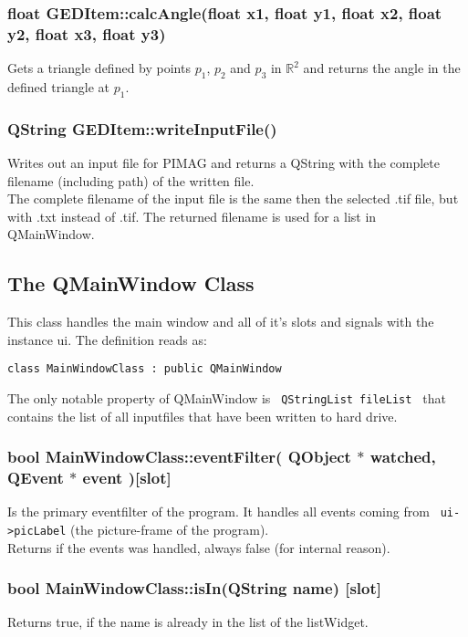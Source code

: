 \subsubsection{float GEDItem::calcAngle(float x1, float y1, float x2, float y2, float x3, float y3)}
Gets a triangle defined by points $p_1$, $p_2$ and $p_3$ in $\mathbb{R}^2$ and returns the angle in the defined triangle at $p_1$. 

\subsubsection{QString GEDItem::writeInputFile()}
Writes out an input file for PIMAG \cite{pimag} and returns a QString with the complete filename (including path) of the written file. \\
The complete filename of the input file is the same then the selected .tif file, but with .txt instead of .tif.  The returned filename is used for a list in QMainWindow. \\

\newpage

\subsection{The QMainWindow Class} 
This class handles the main window and all of it's slots and signals with the instance ui. The definition reads as:
\begin{lstlisting}
class MainWindowClass : public QMainWindow
\end{lstlisting}
The only notable property of QMainWindow is \lstinline$ QStringList fileList $ that contains the list of all inputfiles that have been written to hard drive. 

\subsubsection{bool MainWindowClass::eventFilter( QObject $\ast$ watched, QEvent  $\ast$ event )[slot]}
Is the primary eventfilter of the program. It handles all events coming from \lstinline$ ui->picLabel$ (the picture-frame of the program). \\
Returns if the events was handled, always false (for internal reason). 

\subsubsection{bool MainWindowClass::isIn(QString name)  [slot]  } 
Returns true, if the name is already in the list of the listWidget. 

